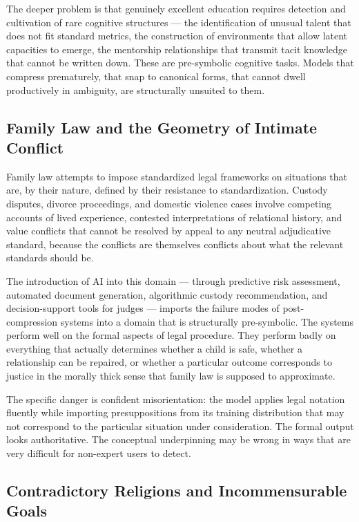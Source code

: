 \documentclass[12pt, a4paper]{article}
\theoremstyle{remark}
\begin{document}
The deeper problem is that genuinely excellent education requires detection and cultivation of rare cognitive structures --- the identification of unusual talent that does not fit standard metrics, the construction of environments that allow latent capacities to emerge, the mentorship relationships that transmit tacit knowledge that cannot be written down. These are pre-symbolic cognitive tasks. Models that compress prematurely, that snap to canonical forms, that cannot dwell productively in ambiguity, are structurally unsuited to them.

\subsection{Family Law and the Geometry of Intimate Conflict}

Family law attempts to impose standardized legal frameworks on situations that are, by their nature, defined by their resistance to standardization. Custody disputes, divorce proceedings, and domestic violence cases involve competing accounts of lived experience, contested interpretations of relational history, and value conflicts that cannot be resolved by appeal to any neutral adjudicative standard, because the conflicts are themselves conflicts about what the relevant standards should be.

The introduction of AI into this domain --- through predictive risk assessment, automated document generation, algorithmic custody recommendation, and decision-support tools for judges --- imports the failure modes of post-compression systems into a domain that is structurally pre-symbolic. The systems perform well on the formal aspects of legal procedure. They perform badly on everything that actually determines whether a child is safe, whether a relationship can be repaired, or whether a particular outcome corresponds to justice in the morally thick sense that family law is supposed to approximate.

The specific danger is confident misorientation: the model applies legal notation fluently while importing presuppositions from its training distribution that may not correspond to the particular situation under consideration. The formal output looks authoritative. The conceptual underpinning may be wrong in ways that are very difficult for non-expert users to detect.

\subsection{Contradictory Religions and Incommensurable Goals}
\end{document}

